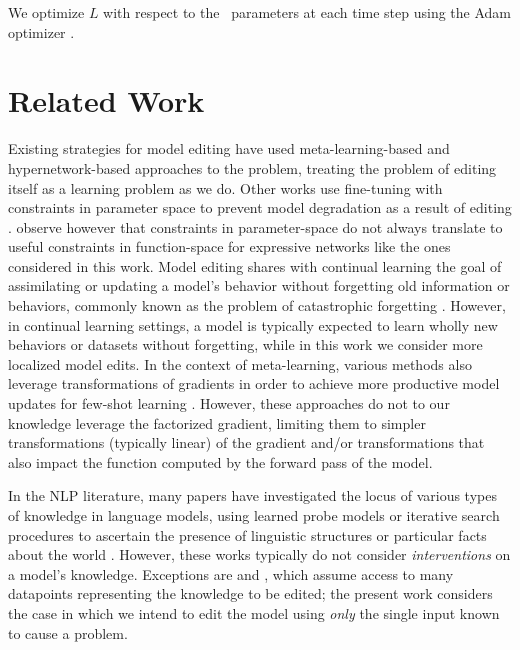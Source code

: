 \documentclass{article}
\begin{document}
We optimize $L$ with respect to the \name~parameters at each time step using the Adam optimizer \citep{kingma2015adam}.

\section{Related Work}



Existing strategies for model editing have used meta-learning-based \citep{finn2017maml,Sinitsin2020Editable} and hypernetwork-based \citep{ha2017hyper,Cao2021EditingFK} approaches to the problem, treating the problem of editing itself as a learning problem as we do. Other works use fine-tuning with constraints in parameter space to prevent model degradation as a result of editing \citep{zhu2020modifying,Sotoudeh2021ProvableRO}. \cite{Cao2021EditingFK} observe however that constraints in parameter-space do not always translate to useful constraints in function-space for expressive networks like the ones considered in this work. Model editing shares with continual learning \citep{mccloskey1989catastrophic,parisi2018continual} the goal of assimilating or updating a model's behavior without forgetting old information or behaviors, commonly known as the problem of catastrophic forgetting \citep{mccloskey1989catastrophic,ratcliff1990connectionist,kirkpatrick2017overcoming}. However, in continual learning settings, a model is typically expected to learn wholly new behaviors or datasets \citep{kirkpatrick2017overcoming,parisi2018continual} without forgetting, while in this work we consider more localized model edits. In the context of meta-learning, various methods also leverage transformations of gradients in order to achieve more productive model updates for few-shot learning \citep{li2017metasgd,lee2018gradient,park2019meta,Flennerhag2020Meta-Learning}. However, these approaches do not to our knowledge leverage the factorized gradient, limiting them to simpler transformations (typically linear) of the gradient and/or transformations that also impact the function computed by the forward pass of the model.

In the NLP literature, many papers have investigated the locus of various types of knowledge in language models, using learned probe models or iterative search procedures to ascertain the presence of linguistic structures \citep{belinkov-etal-2017-neural,conneau-etal-2018-cram,hewitt-manning-2019-structural} or particular facts about the world \cite{petroni-etal-2019-language,Jiang2020HowCW,dai2021knowledge}. However, these works typically do not consider \textit{interventions} on a model's knowledge. Exceptions are \cite{dai2021knowledge} and \cite{wang2020kadapter}, which assume access to many datapoints representing the knowledge to be edited; the present work considers the case in which we intend to edit the model using \textit{only} the single input known to cause a problem.
\end{document}
